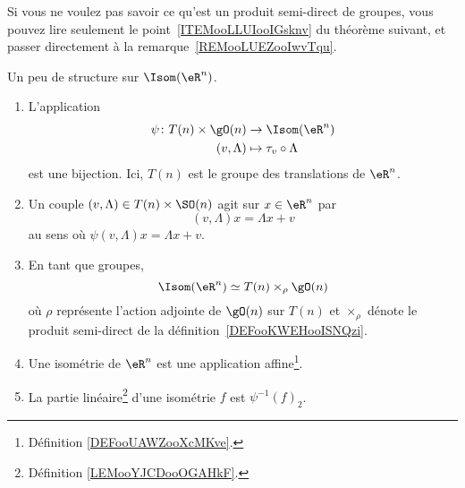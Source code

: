 Si vous ne voulez pas savoir ce qu'est un produit semi-direct de groupes, vous pouvez lire seulement le point~\ref{ITEMooLLUIooIGsknv} du théorème suivant, et passer directement à la remarque~\ref{REMooLUEZooIwvTqu}.
\begin{theorem}     \label{THOooQJSRooMrqQct}
	Un peu de structure sur \( \Isom(\eR^n)\).
	\begin{enumerate}
		\item       \label{ITEMooLLUIooIGsknv}
		      L'application
		      \begin{equation}
			      \begin{aligned}
				      \psi\colon T(n)\times \gO(n) & \to \Isom(\eR^n)           \\
				      (v,\Lambda)                  & \mapsto \tau_v\circ\Lambda
			      \end{aligned}
		      \end{equation}
		      est une bijection. Ici,  \( T(n)\) est le groupe des translations de \( \eR^n\).
		\item
		      Un couple \( (v,\Lambda)\in T(n)\times\SO(n)\) agit sur \( x\in \eR^n\) par
		      \begin{equation}
			      (v,\Lambda)x=\Lambda x+v
		      \end{equation}
		      au sens où \( \psi(v,\Lambda)x=\Lambda x+v\).
		\item       \label{ITEMooEWSIooNKzRxB}
		      En tant que groupes,
		      \begin{equation}
			      \Isom(\eR^n)\simeq T(n)\times_{\rho}\gO(n)
		      \end{equation}
		      où \( \rho\) représente l'action adjointe de \( \gO(n)\) sur \( T(n)\) et \( \times_{\rho}\) dénote le produit semi-direct de la définition~\ref{DEFooKWEHooISNQzi}.
		\item     \label{ITEMooSKUPooBDvNWX}
		      Une isométrie de \( \eR^n\) est une application affine\footnote{Définition \ref{DEFooUAWZooXcMKve}.}.
		\item     \label{ITEMooQLNPooSyHaps}
		      La partie linéaire\footnote{Définition \ref{LEMooYJCDooOGAHkF}.} d'une isométrie \( f\) est \( \psi^{-1}(f)_2\).
	\end{enumerate}
\end{theorem}

